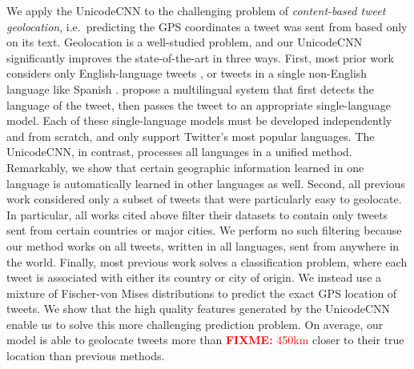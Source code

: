 \documentclass[sigconf,10pt]{acmart}
\newcommand{\defn}[1]{\textit{#1}}
\newcommand{\fixme}[1]{\textcolor{red}{\textbf{FIXME:} {#1}}}
\begin{document}
We apply the UnicodeCNN to the challenging problem of \defn{content-based tweet geolocation},
i.e.\ predicting the GPS coordinates a tweet was sent from based only on its text.
Geolocation is a well-studied problem,
and our UnicodeCNN significantly improves the state-of-the-art in three ways.
First, most prior work considers only English-language tweets \citep{cheng2010you,li2012towards,han2013stacking,mahmud2014home,compton2014geotagging,zhang2014geocoding,rahimi2015twitter,dredze2016geolocation,rahimi2017neural},
or tweets in a single non-English language like Spanish \citep{maier2014language,gonccalves2015learning,tinoco2017variation}. %
\citet{han2014text} propose a multilingual system that first detects the language of the tweet,
then passes the tweet to an appropriate single-language model.
Each of these single-language models must be developed independently and from scratch,
and \citet{han2014text} only support Twitter's most popular languages.
The UnicodeCNN, in contrast, processes all languages in a unified method.
Remarkably, we show that certain geographic information learned in one language is automatically learned in other languages as well.
Second, all previous work considered only a subset of tweets that were particularly easy to geolocate.
In particular, all works cited above filter their datasets to contain only tweets sent from certain countries or major cities.
We perform no such filtering because our method works on all tweets, written in all languages, sent from anywhere in the world.
Finally, most previous work solves a classification problem,
where each tweet is associated with either its country or city of origin.
We instead use a mixture of Fischer-von Mises distributions to predict the exact GPS location of tweets.
We show that the high quality features generated by the UnicodeCNN enable us to solve this more challenging prediction problem.
On average, our model is able to geolocate tweets more than \fixme{450km} closer to their true location than previous methods.
\end{document}
